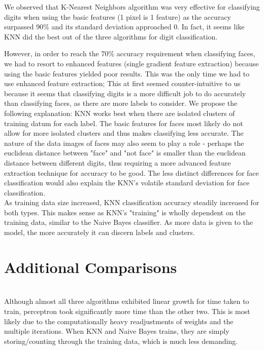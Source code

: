 \documentclass{article}
\begin{document}
We observed that K-Nearest Neighbors algorithm was very effective for classifying digits when using the basic features (1 pixel is 1 feature) as the accuracy surpassed 90\% and its standard deviation approached 0. In fact, it seems like KNN did the best out of the three algorithms for digit classification.

However, in order to reach the 70\% accuracy requirement when classifying faces, we had to resort to enhanced features (single gradient feature extraction) because using the basic features yielded poor results. This was the only time we had to use enhanced feature extraction; This at first seemed counter-intuitive to us because it seems that classifying digits is a more difficult job to do accurately than classifying faces, as there are more labels to consider. We propose the following explanation: KNN works best when there are isolated clusters of training datum for each label. The basic features for faces most likely do not allow for more isolated clusters and thus makes classifying less accurate. The nature of the data images of faces may also seem to play a role - perhaps the euclidean distance between "face" and "not face" is smaller than the euclidean distance between different digits, thus requiring a more advanced feature extraction technique for accuracy to be good. The less distinct differences for face classification would also explain the KNN's volatile standard deviation for face classification. \\

As training data size increased, KNN classification accuracy steadily increased for both types. This makes sense as KNN's "training" is wholly dependent on the training data, similar to the Naive Bayes classifier. As more data is given to the model, the more accurately it can discern labels and clusters. \\




\section{Additional Comparisons}\\
Although almost all three algorithms exhibited linear growth for time taken to train, perceptron took significantly more time than the other two. This is most likely due to the computationally heavy readjustments of weights and the multiple iterations. When KNN and Naive Bayes trains, they are simply storing/counting through the training data, which is much less demanding.\\
\end{document}
